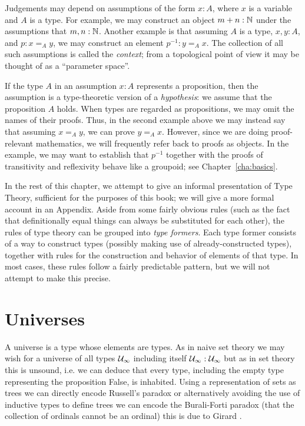 {Judgements may depend on assumptions of the form $x:A$, where $x$ is a variable and $A$ is a type.
For example, we may construct an object $m + n : \mathbb{N}$ under the assumptions that $m,n : \mathbb{N}$.
Another example is that assuming $A$ is a type, $x,y : A$, and $p : x =_A y$, we may construct an element $p^{-1} : y =_A x$.
The collection of all such assumptions is called the \emph{context}; from a topological point of view it may be thought of as a ``parameter space''.

If the type $A$ in an assumption $x:A$ represents a proposition, then the assumption is a type-theoretic version of a \emph{hypothesis}: we assume that the proposition $A$ holds.
When types are regarded as propositions, we may omit the names of their proofs.
Thus, in the second example above we may instead say that assuming $x =_A y$, we can prove $y =_A x$.
However, since we are doing proof-relevant mathematics, we will frequently refer back to proofs as objects.
In the example, we may want to establish that $p^{-1}$ together with the proofs of transitivity and reflexivity behave like a groupoid; see Chapter~\ref{cha:basics}.

In the rest of this chapter, we attempt to give an informal presentation of Type Theory, sufficient for the purposes of this book; we will give a more formal account in an Appendix.
Aside from some fairly obvious rules (such as the fact that definitionally equal things can always be substituted for each other), the rules of type theory can be grouped into \emph{type formers}.
Each type former consists of a way to construct types (possibly making use of already-constructed types), together with rules for the construction and behavior of elements of that type.
In most cases, these rules follow a fairly predictable pattern, but we will not attempt to make this precise.


\section{Universes}
\label{sec:universes}

A universe is a type whose elements are types. As in naive set theory
we may wish for a universe of all types $\mathcal{U}_\infty$ including itself
$\mathcal{U}_\infty : \mathcal{U}_\infty$ but as in set
theory this is unsound, i.e. we can deduce that every type,
including the empty type representing the proposition False, is inhabited. Using a
representation of sets as trees we can directly encode Russell's
paradox \cite{thierry:trees} or alternatively avoiding the use of
inductive types to define trees we can encode the Burali-Forti paradox
(that the collection of ordinals cannot be an ordinal) this is due to
Girard \cite{girard:paradox}.

}
